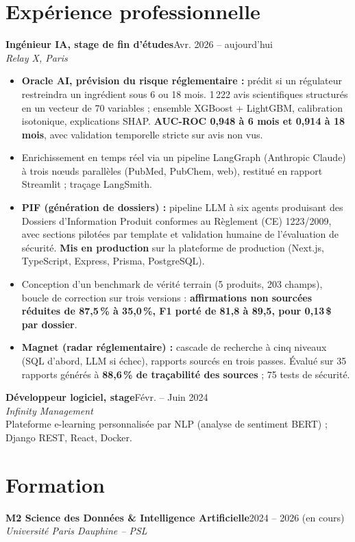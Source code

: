 \documentclass[9.5pt,a4paper]{article}
\newcommand{\jobtitle}[3]{\textbf{#1}\hfill{\small #2}\\[1pt]\textit{#3}}
\begin{document}
\section*{Exp\'erience professionnelle}

\jobtitle{Ing\'enieur IA, stage de fin d'\'etudes}{Avr. 2026 -- aujourd'hui}{Relay X, Paris}

\begin{itemize}
\item \textbf{Oracle AI, pr\'evision du risque r\'eglementaire :} pr\'edit si un r\'egulateur restreindra un ingr\'edient sous 6 ou 18 mois. 1{\,}222 avis scientifiques structur\'es en un vecteur de 70 variables ; ensemble XGBoost + LightGBM, calibration isotonique, explications SHAP. \textbf{AUC-ROC 0,948 \`a 6 mois et 0,914 \`a 18 mois}, avec validation temporelle stricte sur avis non vus.
\item Enrichissement en temps r\'eel via un pipeline LangGraph (Anthropic Claude) \`a trois n\oe uds parall\`eles (PubMed, PubChem, web), restitu\'e en rapport Streamlit ; tra\c{c}age LangSmith.
\item \textbf{PIF (g\'en\'eration de dossiers) :} pipeline LLM \`a six agents produisant des Dossiers d'Information Produit conformes au R\`eglement (CE) 1223/2009, avec sections pilot\'ees par template et validation humaine de l'\'evaluation de s\'ecurit\'e. \textbf{Mis en production} sur la plateforme de production (Next.js, TypeScript, Express, Prisma, PostgreSQL).
\item Conception d'un benchmark de v\'erit\'e terrain (5 produits, 203 champs), boucle de correction sur trois versions : \textbf{affirmations non sourc\'ees r\'eduites de 87,5\,\% \`a 35,0\,\%, F1 port\'e de 81,8 \`a 89,5, pour 0,13\,\$ par dossier}.
\item \textbf{Magnet (radar r\'eglementaire) :} cascade de recherche \`a cinq niveaux (SQL d'abord, LLM si \'echec), rapports sourc\'es en trois passes. \'Evalu\'e sur 35 rapports g\'en\'er\'es \`a \textbf{88,6\,\% de tra\c{c}abilit\'e des sources} ; 75 tests de s\'ecurit\'e.
\end{itemize}

\vspace{1.8mm}
\jobtitle{D\'eveloppeur logiciel, stage}{F\'evr. -- Juin 2024}{Infinity Management}\\[2pt]
Plateforme e-learning personnalis\'ee par NLP (analyse de sentiment BERT) ; Django REST, React, Docker.

\section*{Formation}
\jobtitle{M2 Science des Donn\'ees \& Intelligence Artificielle}{2024 -- 2026 (en cours)}{Universit\'e Paris Dauphine -- PSL}
\end{document}
